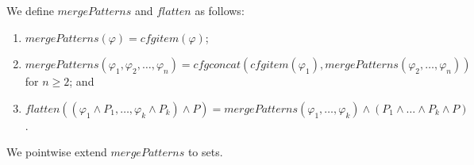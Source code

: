 \documentclass{article}
\begin{document}
\begin{definition}
We define $\mathit{mergePatterns}$ and $\mathit{flatten}$ as follows:
\begin{enumerate}
    \item $\mathit{mergePatterns}(\varphi) = \mathit{cfgitem}(\varphi)$;
    \item $\mathit{mergePatterns}(\varphi_1, \varphi_2, \ldots, \varphi_n)
        = \mathit{cfgconcat}(\mathit{cfgitem}(\varphi_1), \mathit{mergePatterns}(\varphi_2, \ldots, \varphi_n))$ for $n \geq 2$; and
    \item $\mathit{flatten}((\varphi_1 \land P_1, \ldots, \varphi_k \land P_k) \land P)
           = \mathit{mergePatterns}(\varphi_1, \ldots, \varphi_k) \land (P_1 \land \ldots \land P_k \land P)$.
\end{enumerate}
We pointwise extend $\mathit{mergePatterns}$ to sets.
\end{definition}
\end{document}
